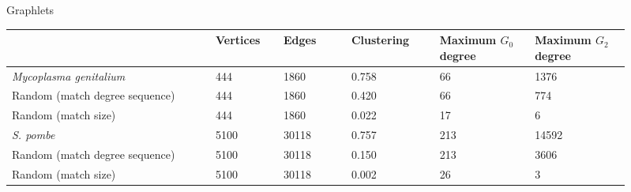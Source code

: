 \documentclass[xcolor=dvipsnames, 14pt]{beamer}
\begin{document}
\begin{frame}{Graphlets}
\centering
\footnotesize
{\setlength\extrarowheight{3pt}\setlength{\tabcolsep}{2pt}
\begin{tabular}{L{0.3\linewidth}C{0.1\linewidth}C{0.1\linewidth}C{0.13\linewidth}C{0.14\linewidth}C{0.14\linewidth}}
\hline
 & Vertices & Edges & Clustering & Maximum $G_0$ degree & Maximum $G_2$ degree \\ \hline

\textit{Mycoplasma genitalium} & 444 & 1860 & 0.758 & 66 & 1376 \\ 
Random (match degree sequence) & 444 & 1860 & 0.420 & 66 & 774  \\ 
Random (match size) & 444 & 1860 &  0.022 & 17 & 6 \\ \hline
\textit{S. pombe} & 5100 & 30118 & 0.757 & 213 & 14592 \\ 
Random (match degree sequence) & 5100 & 30118 & 0.150 & 213 & 3606 \\ 
Random (match size) & 5100 & 30118  & 0.002 & 26 & 3 \\ \hline
\end{tabular}
}
\end{frame}
\end{document}
